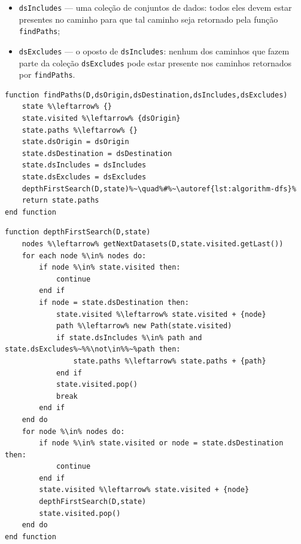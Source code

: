 \begin{itemize}
    \item \texttt{dsIncludes} --- uma coleção de conjuntos de dados: todos eles devem estar presentes no caminho para que tal caminho seja retornado pela função \texttt{findPaths};
    \item \texttt{dsExcludes} --- o oposto de \texttt{dsIncludes}: nenhum dos caminhos que fazem parte da coleção \texttt{dsExcludes} pode estar presente nos caminhos retornados por \texttt{findPaths}.
\end{itemize}

\begin{minipage}[c]{0.95\textwidth}
\begin{lstlisting}[language=pseudocode,label={lst:algorithm-find-paths},caption={[Obtenção dos caminhos entre dois conjuntos de dados.]Obtenção de todos os caminhos entre dois conjuntos de dados, inicializando a \textsc{DFS} com um estado inicial apropriado.}]
function findPaths(D,dsOrigin,dsDestination,dsIncludes,dsExcludes)
    state %\leftarrow% {}
    state.visited %\leftarrow% {dsOrigin}
    state.paths %\leftarrow% {}
    state.dsOrigin = dsOrigin
    state.dsDestination = dsDestination
    state.dsIncludes = dsIncludes
    state.dsExcludes = dsExcludes
    depthFirstSearch(D,state)%~\quad%#%~\autoref{lst:algorithm-dfs}%
    return state.paths
end function
\end{lstlisting}
\end{minipage}

\begin{minipage}[c]{0.95\textwidth}
\begin{lstlisting}[language=pseudocode,label={lst:algorithm-dfs},caption={[Busca em Profundidade (DFS) dos caminhos]Depth First Search (DFS): busca em profundidade de todos os caminhos entre dois conjuntos de dados.}]
function depthFirstSearch(D,state)
    nodes %\leftarrow% getNextDatasets(D,state.visited.getLast())
    for each node %\in% nodes do:
        if node %\in% state.visited then:
            continue
        end if
        if node = state.dsDestination then:
            state.visited %\leftarrow% state.visited + {node}
            path %\leftarrow% new Path(state.visited)
            if state.dsIncludes %\in% path and state.dsExcludes%~%%\not\in%%~%path then:
                state.paths %\leftarrow% state.paths + {path}
            end if
            state.visited.pop()
            break
        end if
    end do
    for node %\in% nodes do:
        if node %\in% state.visited or node = state.dsDestination then:
            continue
        end if
        state.visited %\leftarrow% state.visited + {node}
        depthFirstSearch(D,state)
        state.visited.pop()
    end do
end function
\end{lstlisting}
\end{minipage}

